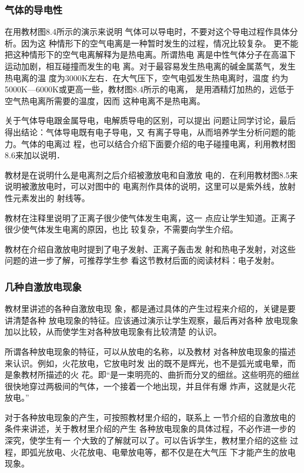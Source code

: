 \subsubsection{气体的导电性}

在用教材图8.4所示的演示来说明
气体可以导电时，不要对这个导电过程作具体分析。因为这
种情形下的空气电离是一种暂时发生的过程，情况比较复杂。
更不能把这种情形下的空气电离解释为是热电离。所谓热电
离是中性气体分子在高温下运动加剧，相互碰撞而发生的电
离。对于最容易发生热电离的碱金属蒸气，发生热电离的温
度为3000K左右．在大气压下，空气电弧发生热电离时，温度
约为5000K—6000K或更高一些，教材图8.4所示的电离，
是用酒精灯加热的，远低于空气热电离所需要的温度，因而
这种电离不是热电离。

关于气体导电跟金属导电，电解质导电的区别，可以提出
问题让同学讨论，最后得出结论：气体导电既有电子导电，又
有离子导电，从而培养学生分析问题的能力。气体的电离过
程，也可以结合介绍下面要介绍的电子碰撞电离，利用教材图
8.6来加以说明．

教材是在说明什么是电离剂之后介绍被激放电和自激放
电的．在利用教材图8.5来说明被激放电时，可以对图中的
电离剂作具体的说明，这里可以是紫外线，放射性元素发出的
射线等。

教材在注释里说明了正离子很少使气体发生电离，这一
点应让学生知道。正离子很少使气体发生电离的原因，也比
较复杂，不需要向学生介绍。

教材在介绍自激放电时提到了电子发射、正离子轰击发
射和热电子发射，对这些问题的进一步了解，可推荐学生参
看这节教材后面的阅读材料：电子发射。

\subsubsection{几种自激放电现象}

教材里讲述的各种自激放电现
象，都是通过具体的产生过程来介绍的，关键是要讲清楚各种
放电现象的特征。应该通过演示让学生观察，最后再对各种
放电现象加以比较，从而使学生对各种放电现象有比较清楚
的认识。

所谓各种放电现象的特征，可以从放电的名称，以及教材
对各种放电现象的描述来认识。例如，火花放电，它放电时发
出的既不是辉光，也不是弧光或电晕，而是象教材所描述的火
花。即“是一束明亮的、曲折而分叉的细丝。这些明亮的细丝
很快地穿过两极间的气体，一个接着一个地出现，并且伴有爆
炸声，这就是火花放电。”

对于各种放电现象的产生，可按照教材里介绍的，联系上
一节介绍的自激放电的条件来讲述，关于教材里介绍的产生
各种放电现象的具体过程，不必作进一步的深究，使学生有一
个大致的了解就可以了。可以告诉学生，教材里介绍的这些
过程，即弧光放电、火花放电、电晕放电等，都不仅是在大气压
下才能产生的放电现象。

